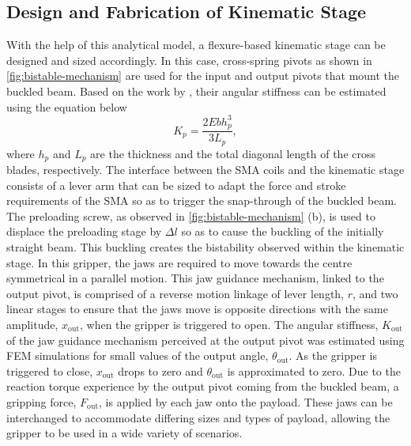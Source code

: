 \subsection{Design and Fabrication of Kinematic Stage}
With the help of this analytical model, a flexure-based kinematic stage can be designed and sized accordingly. In this case, cross-spring pivots as shown in \cref{fig:bistable-mechanism} are used for the input and output pivots that mount the buckled beam. Based on the work by \cite{heneinConceptionStructuresArticulees2005}, their angular stiffness can be estimated using the equation below
\begin{equation}
    K_p = \frac{2Ebh_p^3}{3L_p},
\end{equation}
where $h_p$ and $L_p$ are the thickness and the total diagonal length of the cross blades, respectively. The interface between the SMA coils and the kinematic stage consists of a lever arm that can be sized to adapt the force and stroke requirements of the SMA so as to trigger the snap-through of the buckled beam. The preloading screw, as observed in \cref{fig:bistable-mechanism} (b), is used to displace the preloading stage by $\Delta l$ so as to cause the buckling of the initially straight beam. This buckling creates the bistability observed within the kinematic stage. In this gripper, the jaws are required to move towards the centre symmetrical in a parallel motion. This jaw guidance mechanism, linked to the output pivot, is comprised of a reverse motion linkage of lever length, $r$, and two linear stages to ensure that the jaws move is opposite directions with the same amplitude, $x_\textrm{out}$, when the gripper is triggered to open. The angular stiffness, $K_\textrm{out}$ of the jaw guidance mechanism perceived at the output pivot was estimated using FEM simulations for small values of the output angle, $\theta_\mathrm{out}$. As the gripper is triggered to close, $x_\textrm{out}$ drops to zero and $\theta_\mathrm{out}$ is approximated to zero. Due to the reaction torque experience by the output pivot coming from the buckled beam, a gripping force, $F_\textrm{out}$, is applied by each jaw onto the payload. These jaws can be interchanged to accommodate differing sizes and types of payload, allowing the gripper to be used in a wide variety of scenarios.

